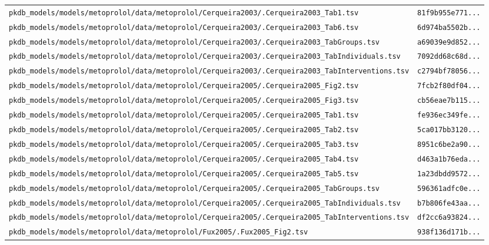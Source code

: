 \begin{longtable}{ll}
\texttt{pkdb\_models/models/metoprolol/data/metoprolol/Cerqueira2003/.Cerqueira2003\_Tab1.tsv} & \texttt{81f9b955e771...} \\
\texttt{pkdb\_models/models/metoprolol/data/metoprolol/Cerqueira2003/.Cerqueira2003\_Tab6.tsv} & \texttt{6d974ba5502b...} \\
\texttt{pkdb\_models/models/metoprolol/data/metoprolol/Cerqueira2003/.Cerqueira2003\_TabGroups.tsv} & \texttt{a69039e9d852...} \\
\texttt{pkdb\_models/models/metoprolol/data/metoprolol/Cerqueira2003/.Cerqueira2003\_TabIndividuals.tsv} & \texttt{7092dd68c68d...} \\
\texttt{pkdb\_models/models/metoprolol/data/metoprolol/Cerqueira2003/.Cerqueira2003\_TabInterventions.tsv} & \texttt{c2794bf78056...} \\
\texttt{pkdb\_models/models/metoprolol/data/metoprolol/Cerqueira2005/.Cerqueira2005\_Fig2.tsv} & \texttt{7fcb2f80df04...} \\
\texttt{pkdb\_models/models/metoprolol/data/metoprolol/Cerqueira2005/.Cerqueira2005\_Fig3.tsv} & \texttt{cb56eae7b115...} \\
\texttt{pkdb\_models/models/metoprolol/data/metoprolol/Cerqueira2005/.Cerqueira2005\_Tab1.tsv} & \texttt{fe936ec349fe...} \\
\texttt{pkdb\_models/models/metoprolol/data/metoprolol/Cerqueira2005/.Cerqueira2005\_Tab2.tsv} & \texttt{5ca017bb3120...} \\
\texttt{pkdb\_models/models/metoprolol/data/metoprolol/Cerqueira2005/.Cerqueira2005\_Tab3.tsv} & \texttt{8951c6be2a90...} \\
\texttt{pkdb\_models/models/metoprolol/data/metoprolol/Cerqueira2005/.Cerqueira2005\_Tab4.tsv} & \texttt{d463a1b76eda...} \\
\texttt{pkdb\_models/models/metoprolol/data/metoprolol/Cerqueira2005/.Cerqueira2005\_Tab5.tsv} & \texttt{1a23dbdd9572...} \\
\texttt{pkdb\_models/models/metoprolol/data/metoprolol/Cerqueira2005/.Cerqueira2005\_TabGroups.tsv} & \texttt{596361adfc0e...} \\
\texttt{pkdb\_models/models/metoprolol/data/metoprolol/Cerqueira2005/.Cerqueira2005\_TabIndividuals.tsv} & \texttt{b7b806fe43aa...} \\
\texttt{pkdb\_models/models/metoprolol/data/metoprolol/Cerqueira2005/.Cerqueira2005\_TabInterventions.tsv} & \texttt{df2cc6a93824...} \\
\texttt{pkdb\_models/models/metoprolol/data/metoprolol/Fux2005/.Fux2005\_Fig2.tsv} & \texttt{938f136d171b...} \\

\end{longtable}
